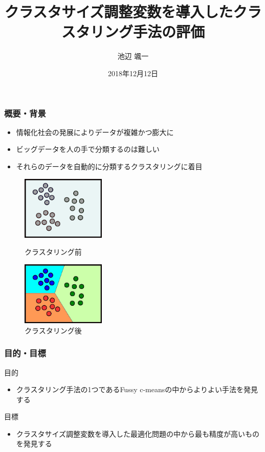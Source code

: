 \documentclass[13pt,dvipdfmx]{beamer}
\title{クラスタサイズ調整変数を導入したクラスタリング手法の評価}
\author{池辺 颯一}
\institute{芝浦工業大学 工学部 通信工学科}
\date{2018年12月12日}
\begin{document}
\begin{frame}\frametitle{}
 \titlepage
\end{frame}

\begin{frame}\frametitle{概要・背景}
\begin{itemize}
 \item 情報化社会の発展によりデータが複雑かつ膨大に
 \item ビッグデータを人の手で分類するのは難しい
 \item それらのデータを自動的に分類するクラスタリングに着目
\end{itemize}
\vspace{5mm}
\begin{figure}[htbp]
 \begin{minipage}{0.4\hsize}
  \begin{center}
   \includegraphics[width=40mm]{before_clustering.png}
  \end{center}
  \captionsetup{labelformat=empty,labelsep=none}
  \caption{クラスタリング前}
  \label{fig:one}
 \end{minipage}
\hspace{1cm}
 \begin{minipage}{0.4\hsize}
  \begin{center}
   \includegraphics[width=40mm]{after_clustering.png}
  \end{center}
  \captionsetup{labelformat=empty,labelsep=none}
  \caption{クラスタリング後}
  \label{fig:two}
 \end{minipage}
\end{figure}
\end{frame}

\begin{frame}\frametitle{目的・目標}
\begin{block}{目的}
\begin{itemize}
\item クラスタリング手法の1つであるFussy c-meansの中からよりよい手法を発見する
\end{itemize}
\end{block}
\vspace{4mm}
\begin{block}{目標}
  \begin{itemize}
  \item クラスタサイズ調整変数を導入した最適化問題の中から最も精度が高いものを発見する
\end{itemize}
\end{block}
\end{frame}
\end{document}
